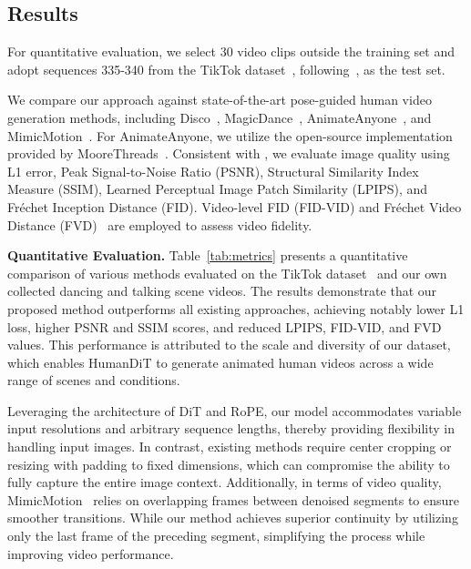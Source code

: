 \subsection{Results}


For quantitative evaluation, we select 30 video clips outside the training set and adopt sequences 335-340 from the TikTok dataset~\cite{jafarian2021learning}, following~\cite{zhang2024mimicmotion}, as the test set.


We compare our approach against state-of-the-art pose-guided human video generation methods, including Disco~\cite{wang2024disco}, MagicDance~\cite{chang2023magicdance}, AnimateAnyone~\cite{hu2024animate}, and MimicMotion~\cite{zhang2024mimicmotion}. For AnimateAnyone, we utilize the open-source implementation provided by MooreThreads~\cite{moore}. Consistent with \cite{wang2024disco}, we evaluate image quality using L1 error, Peak Signal-to-Noise Ratio (PSNR)\cite{hore2010image}, Structural Similarity Index Measure (SSIM)\cite{wang2004image}, Learned Perceptual Image Patch Similarity (LPIPS)\cite{zhang2018unreasonable}, and Fréchet Inception Distance (FID)\cite{heusel2017gans}. Video-level FID (FID-VID)\cite{balaji2019conditional} and Fréchet Video Distance (FVD)~\cite{unterthiner2018towards} are employed to assess video fidelity.

\noindent\textbf{Quantitative Evaluation.} Table~\ref{tab:metrics} presents a quantitative comparison of various methods evaluated on the TikTok dataset~\cite{jafarian2021learning} and our own collected dancing and talking scene videos. The results demonstrate that our proposed method outperforms all existing approaches, achieving notably lower L1 loss, higher PSNR and SSIM scores, and reduced LPIPS, FID-VID, and FVD values. This performance is attributed to the scale and diversity of our dataset, which enables HumanDiT to generate animated human videos across a wide range of scenes and conditions. 

Leveraging the architecture of DiT and RoPE, our model accommodates variable input resolutions and arbitrary sequence lengths, thereby providing flexibility in handling input images. In contrast, existing methods require center cropping or resizing with padding to fixed dimensions, which can compromise the ability to fully capture the entire image context. Additionally, in terms of video quality, MimicMotion~\cite{zhang2024mimicmotion} relies on overlapping frames between denoised segments to ensure smoother transitions. While our method achieves superior continuity by utilizing only the last frame of the preceding segment, simplifying the process while improving video performance.

